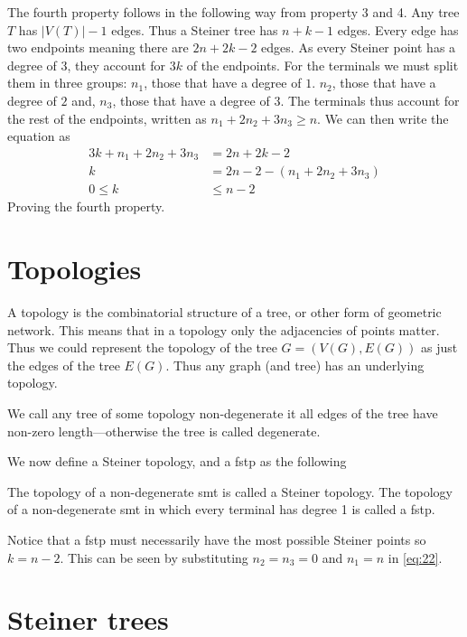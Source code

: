 The fourth property follows in the following way from property 3 and 4. Any
tree $T$ has $|V(T)|-1$ edges. Thus a Steiner tree has $n+k-1$ edges.
Every edge has two endpoints meaning there are $2 n + 2 k - 2$ edges. As every
Steiner point has a degree of $3$, they account for $3 k$ of the endpoints. For
the terminals we must split them in three groups: $n_1$, those that have a
degree of $1$. $n_2$, those that have a degree of $2$ and, $n_3$, those that
have a degree of $3$. The terminals thus account for the rest of the
endpoints, written as $n_1 + 2 n_2 + 3 n_3 \ge n$. We can then write the
equation as
%
\begin{align}
  \label{eq:22}
  3 k + n_1 + 2 n_2 + 3 n_3 &= 2 n + 2 k - 2 \\
  k &= 2 n - 2 - (n_1 + 2 n_2 + 3 n_3) \\
  0 \le k &\le n - 2
\end{align}
%
Proving the fourth property.

\section{Topologies}
\label{sec:topologies-1}

A topology is the combinatorial structure of a tree, or other form of geometric
network. This means that in a topology only the adjacencies of points
matter. Thus we could represent the topology of the tree $G = (V(G), E(G))$ as
just the edges of the tree $E(G)$. Thus any graph (and tree) has an
underlying topology.

We call any tree of some topology non-degenerate it all edges of the tree have
non-zero length---otherwise the tree is called degenerate.

We now define a Steiner topology, and a \gls{fstp} as the following
%
\begin{definition}
The topology of a non-degenerate \gls{smt} is called a Steiner topology. The
topology of a non-degenerate \gls{smt} in which every terminal has degree 1 is
called a \acrlong{fstp}.
\end{definition}
%
Notice that a \gls{fstp} must necessarily have the most possible Steiner points
so $ k = n - 2$. This can be seen by substituting $n_2 = n_3 = 0$ and $n_1 = n$
in \cref{eq:22}.

\section{Steiner trees}
\label{sec:steiner-trees}



